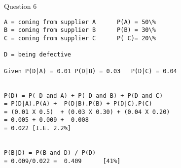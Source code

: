 Question 6

\begin{verbatim}
A = coming from supplier A		P(A) = 50\%
B = coming from supplier B		P(B) = 30\%	
C = coming from supplier C		P( C)= 20\%

D = being defective

Given P(D|A) = 0.01	P(D|B) = 0.03	P(D|C) = 0.04


P(D) = P( D and A) + P( D and B) + P(D and C)
= P(D|A).P(A) +  P(D|B).P(B) + P(D|C).P(C)
= (0.01 X 0.5)  + (0.03 X 0.30) + (0.04 X 0.20)
= 0.005 + 0.009 +  0.008
= 0.022 [I.E. 2.2%]


P(B|D) = P(B and D) / P(D)  
= 0.009/0.022 =  0.409		[41%]
\end{verbatim}

